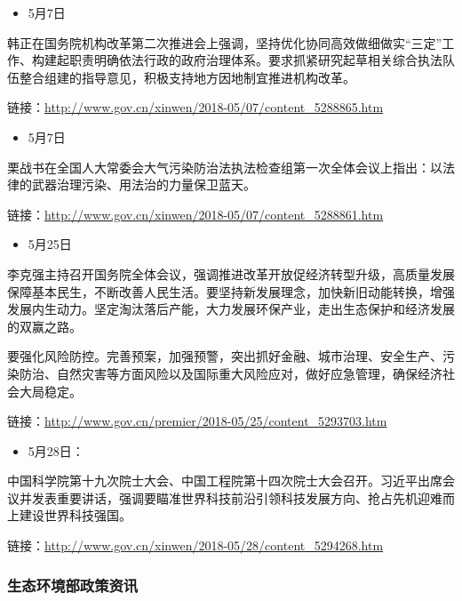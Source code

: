 \documentclass[
]{book}
\providecommand{\tightlist}{%
  \setlength{\itemsep}{0pt}\setlength{\parskip}{0pt}}
\begin{document}
\begin{itemize}
\tightlist
\item
  5月7日
\end{itemize}

韩正在国务院机构改革第二次推进会上强调，坚持优化协同高效做细做实``三定''工作、构建起职责明确依法行政的政府治理体系。要求抓紧研究起草相关综合执法队伍整合组建的指导意见，积极支持地方因地制宜推进机构改革。

链接：\url{http://www.gov.cn/xinwen/2018-05/07/content_5288865.htm}

\begin{itemize}
\tightlist
\item
  5月7日
\end{itemize}

栗战书在全国人大常委会大气污染防治法执法检查组第一次全体会议上指出：以法律的武器治理污染、用法治的力量保卫蓝天。

链接：\url{http://www.gov.cn/xinwen/2018-05/07/content_5288861.htm}

\begin{itemize}
\tightlist
\item
  5月25日
\end{itemize}

李克强主持召开国务院全体会议，强调推进改革开放促经济转型升级，高质量发展保障基本民生，不断改善人民生活。要坚持新发展理念，加快新旧动能转换，增强发展内生动力。坚定淘汰落后产能，大力发展环保产业，走出生态保护和经济发展的双赢之路。

要强化风险防控。完善预案，加强预警，突出抓好金融、城市治理、安全生产、污染防治、自然灾害等方面风险以及国际重大风险应对，做好应急管理，确保经济社会大局稳定。

链接：\url{http://www.gov.cn/premier/2018-05/25/content_5293703.htm}

\begin{itemize}
\tightlist
\item
  5月28日：
\end{itemize}

中国科学院第十九次院士大会、中国工程院第十四次院士大会召开。习近平出席会议并发表重要讲话，强调要瞄准世界科技前沿引领科技发展方向、抢占先机迎难而上建设世界科技强国。

链接：\url{http://www.gov.cn/xinwen/2018-05/28/content_5294268.htm}

\hypertarget{ux751fux6001ux73afux5883ux90e8ux653fux7b56ux8d44ux8baf-1}{%
\subsubsection*{生态环境部政策资讯}\label{ux751fux6001ux73afux5883ux90e8ux653fux7b56ux8d44ux8baf-1}}
\end{document}
